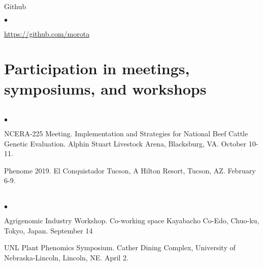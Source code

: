 \documentclass[margin,line,10pt]{res}
\newenvironment{list1}{
  \begin{list}{\ding{113}}{%
      \setlength{\itemsep}{0in}
      \setlength{\parsep}{0in} \setlength{\parskip}{0in}
      \setlength{\topsep}{0in} \setlength{\partopsep}{0in} 
      \setlength{\leftmargin}{0.17in}}}{\end{list}}
\newenvironment{list2}{
  \begin{list}{$\bullet$}{%
      \setlength{\itemsep}{0in}
      \setlength{\parsep}{0in} \setlength{\parskip}{0in}
      \setlength{\topsep}{0in} \setlength{\partopsep}{0in} 
      \setlength{\leftmargin}{0.2in}}}{\end{list}}
\begin{document}
\begin{resume}
\begin{list1}
\vspace{0.3cm}
\item[] Github
\begin{list2}
\item \textcolor{blue}{\href{https://github.com/morota}{https://github.com/morota}} 
\end{list2}
\end{list1}









\vspace{0.5cm}
\section{\sc Participation in meetings, symposiums, and workshops} 
\vspace{2cm}


\section{}
\begin{list2}

\item NCERA-225 Meeting. Implementation and Strategies for National Beef Cattle Genetic Evaluation. Alphin Stuart Livestock Arena, Blacksburg, VA. October 10-11.

  \vspace{0.5cm}

\item Phenome 2019. El Conquistador Tucson, A Hilton Resort, Tucson, AZ. February 6-9.

\end{list2}




\section{}
\begin{list2}

  \item Agrigenomic Industry Workshop. Co-working space Kayabacho Co-Edo, Chuo-ku, Tokyo, Japan. September 14

    \vspace{0.5cm}
    
\item UNL Plant Phenomics Symposium. Cather Dining Complex, University of Nebraska-Lincoln, Lincoln, NE. April 2.


\end{list2}
\end{resume}
\end{document}
